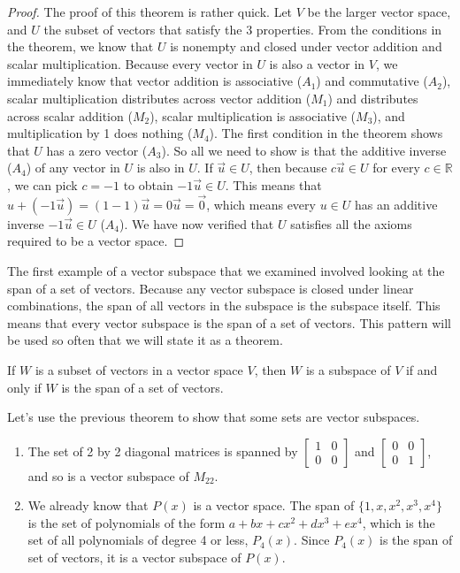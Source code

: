 \begin{proof}
The proof of this theorem is rather quick. Let $V$ be the larger vector space, and $U$ the subset of vectors that satisfy the 3 properties.  From the conditions in the theorem, we know that $U$ is nonempty and closed under vector addition and scalar multiplication. Because every vector in $U$ is also a vector in $V$, we immediately know that vector addition is associative ($A_1$) and commutative ($A_2$), scalar multiplication distributes across vector addition ($M_1$) and distributes across scalar addition ($M_2$), scalar multiplication is associative ($M_3$), and multiplication by 1 does nothing ($M_4$). The first condition in the theorem shows that $U$ has a zero vector ($A_3$). So all we need to show is that the additive inverse ($A_4$) of any vector in $U$ is also in $U$. If $\vec u\in U$, then because $c\vec u\in U$ for every $c\in \mathbb{R}$, we can pick $c=-1$ to obtain $-1 \vec u\in U$. This means that $u+(-1\vec u) = (1-1)\vec u = 0\vec u = \vec 0$, which means every $u\in U$ has an additive inverse $-1\vec u\in U$ ($A_4$). We have now verified that $U$ satisfies all the axioms required to be a vector space.
\end{proof}


The first example of a vector subspace that we examined involved looking at the span of a set of vectors. Because any vector subspace is closed under linear combinations, the span of all vectors in the subspace is the subspace itself. This means that every vector subspace is the span of a set of vectors. This pattern will be used so often that we will state it as a theorem.

\begin{theorem}\label{thm subspace iff span}
If $W$ is a subset of vectors in a vector space $V$, then $W$ is a subspace of $V$ if and only if $W$ is the span of a set of vectors.
\end{theorem}


\begin{example}
Let's use the previous theorem to show that some sets are vector subspaces. 
\begin{enumerate}
	\item The set of 2 by 2 diagonal matrices is spanned by 
	$\begin{bmatrix}1&0\\0&0\end{bmatrix}$ and $\begin{bmatrix}0&0\\0&1\end{bmatrix}$, and so is a vector subspace of $M_{22}$.
	\item We already know that $P(x)$ is a vector space. The span of $\{1,x,x^2,x^3,x^4\}$ is the set of polynomials of the form $a+bx+cx^2+dx^3+ex^4$, which is the set of all polynomials of degree 4 or less, $P_4(x)$. Since $P_4(x)$ is the span of set of vectors, it is a vector subspace of $P(x)$. 
\end{enumerate}
\end{example}



